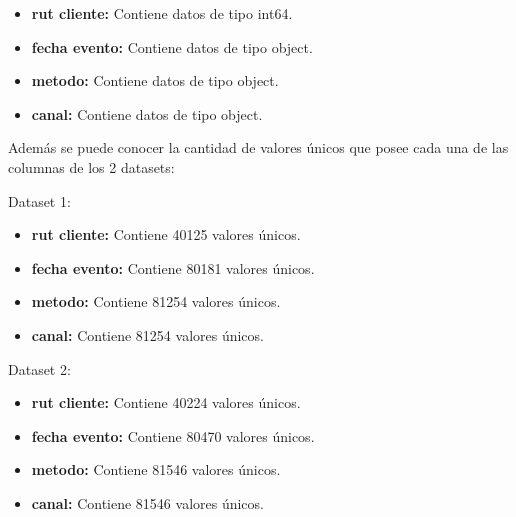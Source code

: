 \begin{itemize}
    \item \textbf{rut cliente:} Contiene datos de tipo int64.
    \item \textbf{fecha evento:} Contiene datos de tipo object.
    \item \textbf{metodo:} Contiene datos de tipo object.
    \item \textbf{canal:} Contiene datos de tipo object.
\end{itemize}

Además se puede conocer la cantidad de valores únicos que posee cada una de las columnas de los 2 datasets:

Dataset 1:

\begin{itemize}
    \item \textbf{rut cliente:} Contiene 40125 valores únicos.
    \item \textbf{fecha evento:} Contiene 80181 valores únicos.
    \item \textbf{metodo:} Contiene 81254 valores únicos.
    \item \textbf{canal:} Contiene 81254 valores únicos.
\end{itemize}

Dataset 2:

\begin{itemize}
    \item \textbf{rut cliente:} Contiene 40224 valores únicos.
    \item \textbf{fecha evento:} Contiene 80470 valores únicos.
    \item \textbf{metodo:} Contiene 81546 valores únicos.
    \item \textbf{canal:} Contiene 81546 valores únicos.
\end{itemize}


